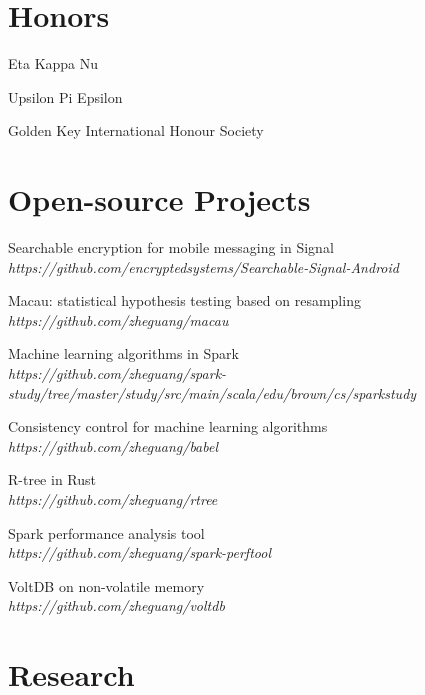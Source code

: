 \documentclass[letterpaper]{article}
\renewenvironment{itemize}{
  \begin{list}{}{
    \setlength{\leftmargin}{1.5em}
  }
}{
  \end{list}
}
\begin{document}
\section*{Honors}
\begin{itemize}
\item Eta Kappa Nu
\item Upsilon Pi Epsilon
\item Golden Key International Honour Society
\end{itemize}

\section*{Open-source Projects}
\begin{itemize}
\item Searchable encryption for mobile messaging in Signal \\ \textit{https://github.com/encryptedsystems/Searchable-Signal-Android}
\item Macau: statistical hypothesis testing based on resampling \\ \textit{https://github.com/zheguang/macau}
\item Machine learning algorithms in Spark \\ \textit{https://github.com/zheguang/spark-study/tree/master/study/src/main/scala/edu/brown/cs/sparkstudy}
\item Consistency control for machine learning algorithms \\ \textit{https://github.com/zheguang/babel}
\item R-tree in Rust \\ \textit{https://github.com/zheguang/rtree}
\item Spark performance analysis tool \\ \textit{https://github.com/zheguang/spark-perftool}
\item VoltDB on non-volatile memory \\ \textit{https://github.com/zheguang/voltdb}
\end{itemize}


\section*{Research}
\end{document}
